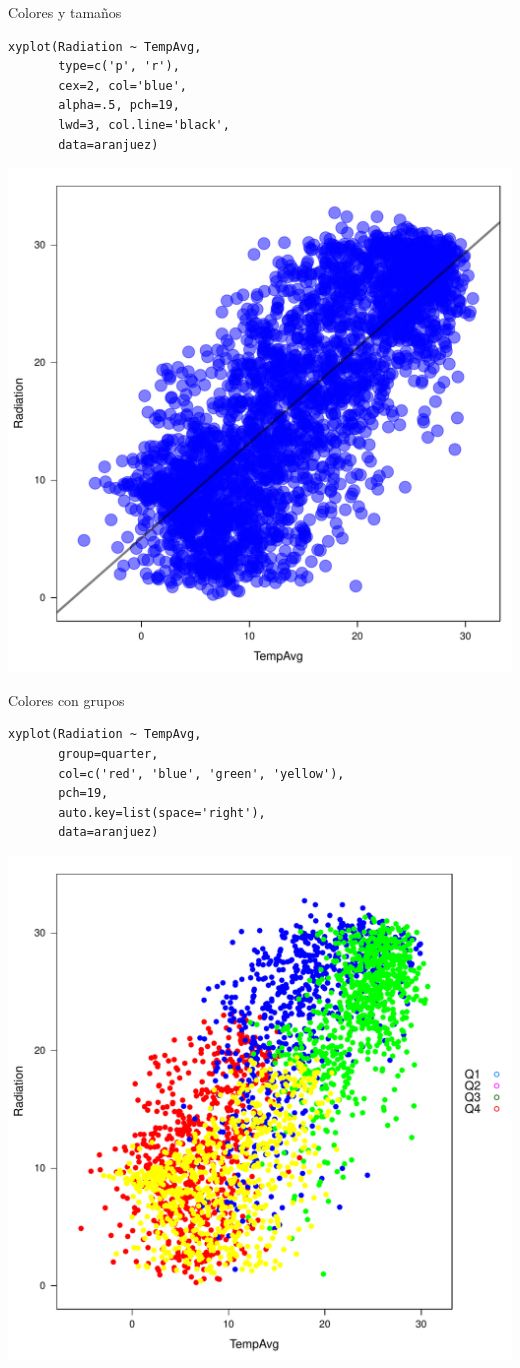 \documentclass[xcolor={usenames,svgnames,dvipsnames}]{beamer}
\begin{document}
\begin{frame}[fragile,label=sec-2-1-10]{Colores y tamaños}
 \lstset{language=R,numbers=none}
\begin{lstlisting}
xyplot(Radiation ~ TempAvg,
       type=c('p', 'r'),
       cex=2, col='blue',
       alpha=.5, pch=19,
       lwd=3, col.line='black',
       data=aranjuez)
\end{lstlisting}

\includegraphics[width=.9\linewidth]{figs/xyplotColors.pdf}
\end{frame}
\begin{frame}[fragile,label=sec-2-1-11]{Colores con grupos}
 \lstset{language=R,numbers=none}
\begin{lstlisting}
xyplot(Radiation ~ TempAvg,
       group=quarter,
       col=c('red', 'blue', 'green', 'yellow'),
       pch=19,
       auto.key=list(space='right'),
       data=aranjuez)
\end{lstlisting}

\includegraphics[width=.9\linewidth]{figs/xyplotColorGroups.pdf}
\end{frame}
\end{document}
